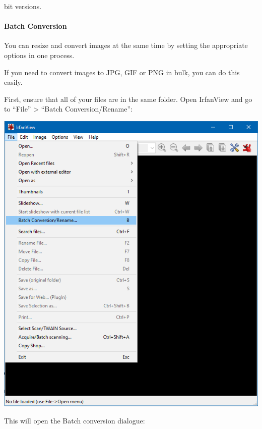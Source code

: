 \documentclass[]{book}
\let\oldparagraph\paragraph
\renewcommand{\paragraph}[1]{\oldparagraph{#1}\mbox{}}
\begin{document}
bit versions.

\paragraph{Batch Conversion}\label{batch-conversion}

\begin{info}
You can resize and convert images at the same time by setting the
appropriate options in one process.
\end{info}

If you need to convert images to JPG, GIF or PNG in bulk, you can do
this easily.

First, ensure that all of your files are in the same folder. Open
IrfanView and go to ``File'' \textgreater{} ``Batch Conversion/Rename'':

\includegraphics{images/screenshots/irfanview_2.png}

This will open the Batch conversion dialogue:
\end{document}
